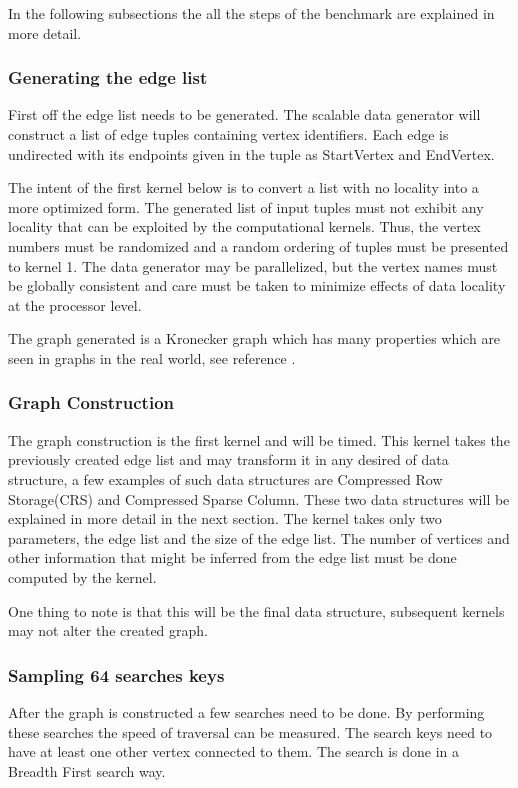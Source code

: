 In the following subsections the all the steps of the benchmark are explained in more detail.

\subsubsection{Generating the edge list}
First off the edge list needs to be generated. 
The scalable data generator will construct a list of edge tuples containing vertex identifiers. Each edge is undirected with its endpoints given in the tuple as StartVertex and EndVertex.

The intent of the first kernel below is to convert a list with no locality into a more optimized form. The generated list of input tuples must not exhibit any locality that can be exploited by the computational kernels. Thus, the vertex numbers must be randomized and a random ordering of tuples must be presented to kernel 1. The data generator may be parallelized, but the vertex names must be globally consistent and care must be taken to minimize effects of data locality at the processor level.

The graph generated is a Kronecker graph which has many properties which are seen in graphs in the real world, see reference \cite{leskovec2010kronecker}.

\subsubsection{Graph Construction}
The graph construction is the first kernel and will be timed. This kernel takes the previously created edge list and may transform it in any desired of data structure, a few examples of such data structures are Compressed Row Storage(CRS) and Compressed Sparse Column. These two data structures will be explained in more detail in the next section. The kernel takes only two parameters, the edge list and the size of the edge list. The number of vertices and other information that might be inferred from the edge list must be done computed by the kernel. 

One thing to note is that this will be the final data structure, subsequent kernels may not alter the created graph. 

\subsubsection{Sampling 64 searches keys}
After the graph is constructed a few searches need to be done. By performing these searches the speed of traversal can be measured. The search keys need to have at least one other vertex connected to them. The search is done in a Breadth First search way.   

